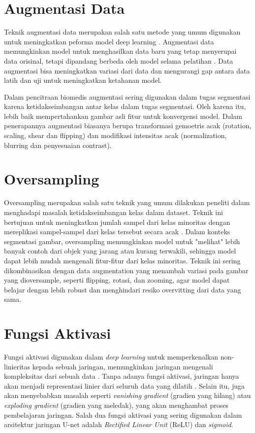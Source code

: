 \section{Augmentasi Data}

\noindent Teknik augmentasi data merupakan salah satu metode yang umum digunakan untuk meningkatkan peforma model deep learning \cite{minaee_image_2020}. Augmentasi data memungkinkan model untuk menghasilkan data baru yang tetap menyerupai data orisinal, tetapi dipandang berbeda oleh model selama pelatihan \cite{huang_fully_2022}. Data augmentasi bisa meningkatkan variasi dari data dan mengurangi gap antara data latih dan uji untuk meningkatkan ketahanan model.

\noindent Dalam pencitraan biomedis augmentasi sering digunakan dalam tugas segmentasi karena ketidakseimbangan antar kelas dalam tugas segmentasi. Oleh karena itu, lebih baik mempertahankan gambar asli fitur untuk konvergensi model. Dalam penerapannya augmentasi biasanya berupa transformasi gemoetris acak (rotation, scaling, shear dan flipping) dan modifikasi intensitas acak (normalization, blurring dan penyesuaian contrast)\cite{minaee_image_2020}.

\section{Oversampling}

\noindent Oversampling merupakan salah satu teknik yang umum dilakukan peneliti dalam menghadapi masalah ketidakseimbangan kelas dalam dataset. Teknik ini bertujuan untuk meningkatkan jumlah sampel dari kelas minoritas dengan mereplikasi sampel-sampel dari kelas tersebut secara acak \cite{bria_addressing_2020}. Dalam konteks segmentasi gambar, oversampling memungkinkan model untuk "melihat" lebih banyak contoh dari objek yang jarang atau kurang terwakili, sehingga model dapat lebih mudah mengenali fitur-fitur dari kelas minoritas. Teknik ini sering dikombinasikan dengan data augmentation yang menambah variasi pada gambar yang dioversample, seperti flipping, rotasi, dan zooming, agar model dapat belajar dengan lebih robust dan menghindari resiko overvitting dari data yang sama.


\section{Fungsi Aktivasi}

\noindent Fungsi aktivasi digunakan dalam \textit{deep learning} untuk memperkenalkan non-linieritas kepada sebuah jaringan, memungkinkan jaringan mengenali kompleksitas dari sebuah data \cite{younisse_fine-tuning_2023,heaton_ian_2018}. Tanpa adanya fungsi aktivasi, jaringan hanya akan menjadi representasi linier dari seluruh data yang dilatih \cite{chiang_activation_2023}. Selain itu, juga akan menyebabkan masalah seperti \textit{vanishing gradient} (gradien yang hilang) atau \textit{exploding gradient} (gradien yang meledak), yang akan menghambat proses pembelajaran jaringan. Salah dua fungsi aktivasi yang sering digunakan dalam arsitektur jaringan U-net adalah \textit{Rectified Linear Unit} (ReLU) dan \textit{sigmoid}. %

